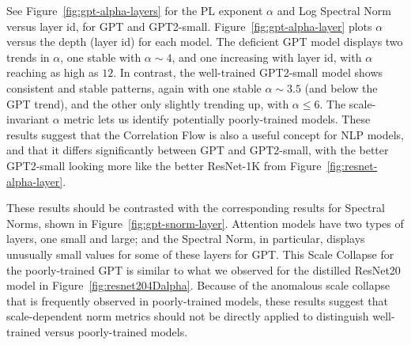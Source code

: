 See Figure~\ref{fig:gpt-alpha-layers} for the PL exponent $\alpha$ and Log Spectral Norm versus layer id, for GPT and GPT2-small.
Figure~\ref{fig:gpt-alpha-layer} plots $\alpha$ versus the depth (layer id) for each model.
The deficient GPT model displays two trends in $\alpha$, one stable with $\alpha\sim 4$, and one increasing with layer id, with $\alpha$ reaching as high as $12$.
In contrast, the well-trained GPT2-small model shows consistent and stable patterns, again with one stable $\alpha\sim 3.5$ (and below the GPT trend), and the other only slightly trending up, with $\alpha\le 6$. 
The scale-invariant $\alpha$ metric lets us identify potentially poorly-trained models.
These results suggest that the Correlation Flow is also a useful concept for NLP models, and that it differs significantly between GPT and GPT2-small, with the better GPT2-small looking more like the better ResNet-1K from Figure~\ref{fig:resnet-alpha-layer}.

These results should be contrasted with the corresponding results for Spectral Norms, shown in Figure~\ref{fig:gpt-snorm-layer}.
Attention models have two types of layers, one small and large; and the Spectral Norm, in particular, displays unusually small values for some of these layers for GPT.
This Scale Collapse for the poorly-trained GPT is similar to what we observed for the distilled ResNet20 model in Figure~\ref{fig:resnet204Dalpha}.
Because of the anomalous scale collapse that is frequently observed in poorly-trained models, these results suggest that scale-dependent norm metrics should not be directly applied to distinguish well-trained versus poorly-trained models. 


